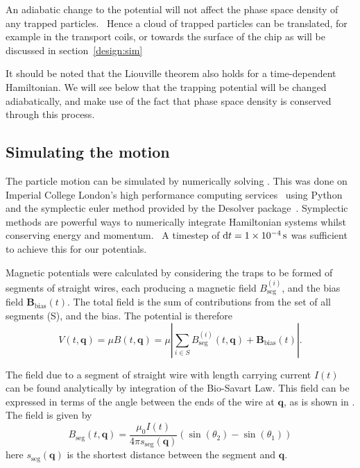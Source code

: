 An adiabatic change to the potential will not affect the phase space density of
any trapped particles.~\cite{Hand1998, Lichtenberg1969} Hence a cloud of
trapped particles can be translated, for example in the transport coils, or
towards the surface of the chip as will be discussed in
section~\ref{design:sim}

It should be noted that the Liouville theorem also holds for a time-dependent
Hamiltonian. We will see below that the trapping potential will be changed
adiabatically, and make use of the fact that phase space density is conserved
through this process.

\subsection{Simulating the motion}
\label{design:motion:simmethods}


The particle motion can be simulated by numerically solving
. This was done on Imperial College London's high
performance computing services~\cite{ICRCS} using Python~\cite{python} and the
symplectic euler method provided by the Desolver package~\cite{desolver}.
Symplectic methods are powerful ways to numerically integrate Hamiltonian
systems whilst conserving energy and momentum.~\cite{Hairer2015,
doi:10.1119/1.2034523} A timestep of $\dd t = \SI{1E-4}{\second}$ was
sufficient to achieve this for our potentials.

Magnetic potentials were calculated by considering the traps to be formed of
segments of straight wires, each producing a magnetic field
$B_\text{seg}^{(i)}$, and the bias field $\mathbf{B}_\text{bias}(t)$. The total
field is the sum of contributions from the set of all segments (S), and the
bias. The potential is therefore
%
\begin{equation} V(t, \mathbf{q}) = \mu B (t, \mathbf{q}) = \mu \left|
  \sum_{i\in S}
B_\text{seg}^{(i)}(t, \mathbf{q}) + \mathbf{B}_\text{bias}(t)\right|.
\end{equation}

The field due to a segment of straight wire with length carrying current $I(t)$
can be found analytically by integration of the Bio-Savart Law.
This field can be expressed in terms of the angle between the ends of the wire
at $\mathbf{q}$, as is shown in . The field
is given by~\cite{Griffiths2017}
%
\begin{equation}
  B_\text{seg}(t, \mathbf{q}) = \frac{\mu_0 I(t)}{4\pi
  s_\text{seg}(\mathbf{q})} (\sin(\theta_2)  - \sin(\theta_1))
\label{design:eq:segmentfield}
\end{equation}
here $s_\text{seg}(\mathbf{q})$ is the shortest distance between the segment
and $\mathbf{q}$.

